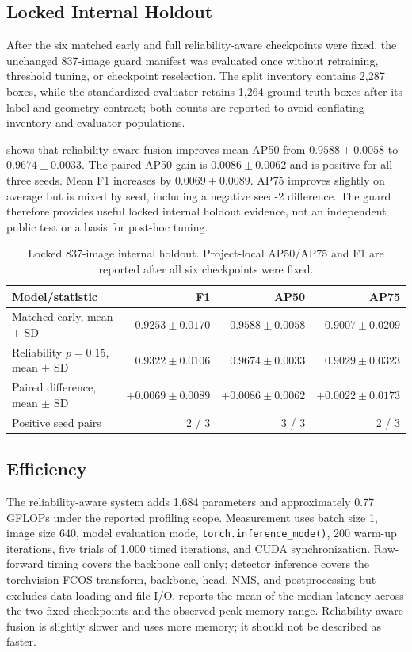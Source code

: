 \subsection{Locked Internal Holdout}
After the six matched early and full reliability-aware checkpoints were fixed, the unchanged 837-image guard manifest was evaluated once without retraining, threshold tuning, or checkpoint reselection. The split inventory contains 2,287 boxes, while the standardized evaluator retains 1,264 ground-truth boxes after its label and geometry contract; both counts are reported to avoid conflating inventory and evaluator populations.

 shows that reliability-aware fusion improves mean AP50 from $0.9588\pm0.0058$ to $0.9674\pm0.0033$. The paired AP50 gain is $0.0086\pm0.0062$ and is positive for all three seeds. Mean F1 increases by $0.0069\pm0.0089$. AP75 improves slightly on average but is mixed by seed, including a negative seed-2 difference. The guard therefore provides useful locked internal holdout evidence, not an independent public test or a basis for post-hoc tuning.

\begin{table}[t]
\centering
\caption{Locked 837-image internal holdout. Project-local AP50/AP75 and F1 are reported after all six checkpoints were fixed.}
\label{tab:guard}
\small
\begin{tabular}{@{}lrrr@{}}
\toprule
Model/statistic & F1 & AP50 & AP75\\
\midrule
Matched early, mean $\pm$ SD & $0.9253\pm0.0170$ & $0.9588\pm0.0058$ & $0.9007\pm0.0209$\\
Reliability $p=0.15$, mean $\pm$ SD & $0.9322\pm0.0106$ & $0.9674\pm0.0033$ & $0.9029\pm0.0323$\\
Paired difference, mean $\pm$ SD & $+0.0069\pm0.0089$ & $+0.0086\pm0.0062$ & $+0.0022\pm0.0173$\\
Positive seed pairs & 2 / 3 & 3 / 3 & 2 / 3\\
\bottomrule
\end{tabular}
\end{table}

\subsection{Efficiency}
The reliability-aware system adds 1,684 parameters and approximately 0.77 GFLOPs under the reported profiling scope. Measurement uses batch size 1, image size 640, model evaluation mode, \texttt{torch.inference\_mode()}, 200 warm-up iterations, five trials of 1,000 timed iterations, and CUDA synchronization. Raw-forward timing covers the backbone call only; detector inference covers the torchvision FCOS transform, backbone, head, NMS, and postprocessing but excludes data loading and file I/O.  reports the mean of the median latency across the two fixed checkpoints and the observed peak-memory range. Reliability-aware fusion is slightly slower and uses more memory; it should not be described as faster.

